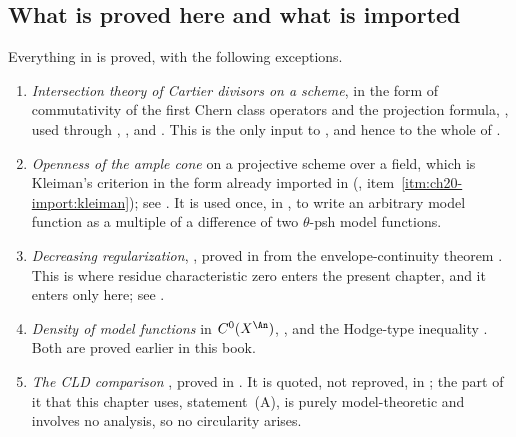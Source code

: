 \subsection{What is proved here and what is imported}
\label{sec:ch24-imported}

Everything in
 is proved, with the
following exceptions.

\begin{enumerate}
\item\label{itm:ch24-import:intersection}
 \emph{Intersection theory of Cartier divisors on a scheme}, in the form of
 commutativity of the first Chern class operators and the projection
 formula, \cite[Chapters~1--2]{Ful}, used through
 , ,
  and
 .  This is the only input to
 , and hence to the whole of
 .
\item\label{itm:ch24-import:kleiman}
 \emph{Openness of the ample cone} on a projective scheme over a field,
 which is Kleiman's criterion in the form already imported in
 (, item~\cref{itm:ch20-import:kleiman}); see
 \cite[\S1.4]{PAG1}.  It is used once, in ,
 to write an arbitrary model function as a multiple of a difference of two
 \(\theta\)-psh model functions.
\item\label{itm:ch24-import:regularization}
 \emph{Decreasing regularization}, ,
 proved in  from the envelope-continuity theorem
 .  This is where residue characteristic
 zero enters the present chapter, and it enters only here; see
 .
\item\label{itm:ch24-import:density}
 \emph{Density of model functions} in \(C^0(X^{\An})\),
 , and the Hodge-type inequality
 .  Both are proved earlier in this book.
\item\label{itm:ch24-import:cld}
 \emph{The CLD comparison} , proved in
 .  It is quoted, not reproved, in
 ; the part of it that this chapter uses,
 statement~(A), is purely model-theoretic and involves no analysis, so no
 circularity arises.
\end{enumerate}

